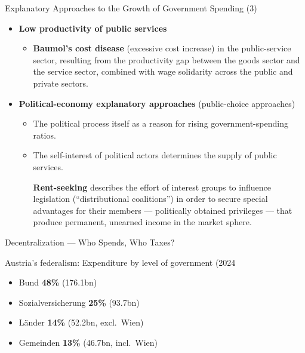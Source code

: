 \documentclass[11pt,aspectratio=169]{beamer}
\begin{document}
\begin{frame}{Explanatory Approaches to the Growth of Government Spending (3)}

	\begin{itemize}
		\item \textbf{Low productivity of public services}
		\begin{itemize}
			\item \textbf{Baumol's cost disease} (excessive cost increase) in the public-service sector, resulting from the productivity gap between the goods sector and the service sector, combined with wage solidarity across the public and private sectors.
		\end{itemize}
		\item \textbf{Political-economy explanatory approaches} (public-choice approaches)
		\begin{itemize}
			\item The political process itself as a reason for rising government-spending ratios.
			\item The self-interest of political actors determines the supply of public services.

			\textbf{Rent-seeking} describes the effort of interest groups to influence legislation (``distributional coalitions'') in order to secure special advantages for their members --- politically obtained privileges --- that produce permanent, unearned income in the market sphere.
			\end{itemize}

	\end{itemize}

\end{frame}



\begin{frame}{Decentralization --- Who Spends, Who Taxes?}
  \vspace{1em}
  \begin{alertblock}{Austria's federalism: Expenditure by level of government (2024}
  	\begin{itemize}
  		\item 	Bund \textbf{48\%} (\texteuro{}176.1bn)
  		\item   Sozialversicherung \textbf{25\%} (\texteuro{}93.7bn)
  		\item   Länder \textbf{14\%} (\texteuro{}52.2bn, excl.\ Wien)
  		\item  Gemeinden \textbf{13\%} (\texteuro{}46.7bn, incl.\ Wien)
  	\end{itemize}
 
 
  \end{alertblock}
 

\end{frame}
\end{document}
